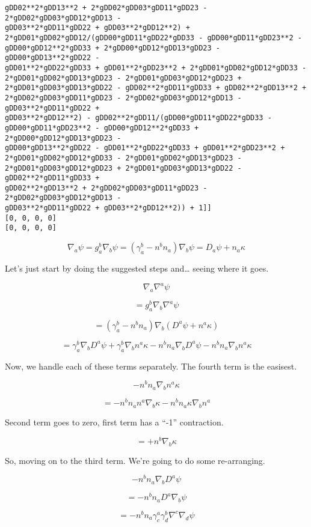 \documentclass[landscape,letterpaper,10pt,english]{article}
\begin{document}
\begin{Verbatim}[commandchars=\\\{\}]
gDD02**2*gDD13**2 + 2*gDD02*gDD03*gDD11*gDD23 - 2*gDD02*gDD03*gDD12*gDD13 -
gDD03**2*gDD11*gDD22 + gDD03**2*gDD12**2) +
2*gDD01*gDD02*gDD12/(gDD00*gDD11*gDD22*gDD33 - gDD00*gDD11*gDD23**2 -
gDD00*gDD12**2*gDD33 + 2*gDD00*gDD12*gDD13*gDD23 - gDD00*gDD13**2*gDD22 -
gDD01**2*gDD22*gDD33 + gDD01**2*gDD23**2 + 2*gDD01*gDD02*gDD12*gDD33 -
2*gDD01*gDD02*gDD13*gDD23 - 2*gDD01*gDD03*gDD12*gDD23 +
2*gDD01*gDD03*gDD13*gDD22 - gDD02**2*gDD11*gDD33 + gDD02**2*gDD13**2 +
2*gDD02*gDD03*gDD11*gDD23 - 2*gDD02*gDD03*gDD12*gDD13 - gDD03**2*gDD11*gDD22 +
gDD03**2*gDD12**2) - gDD02**2*gDD11/(gDD00*gDD11*gDD22*gDD33 -
gDD00*gDD11*gDD23**2 - gDD00*gDD12**2*gDD33 + 2*gDD00*gDD12*gDD13*gDD23 -
gDD00*gDD13**2*gDD22 - gDD01**2*gDD22*gDD33 + gDD01**2*gDD23**2 +
2*gDD01*gDD02*gDD12*gDD33 - 2*gDD01*gDD02*gDD13*gDD23 -
2*gDD01*gDD03*gDD12*gDD23 + 2*gDD01*gDD03*gDD13*gDD22 - gDD02**2*gDD11*gDD33 +
gDD02**2*gDD13**2 + 2*gDD02*gDD03*gDD11*gDD23 - 2*gDD02*gDD03*gDD12*gDD13 -
gDD03**2*gDD11*gDD22 + gDD03**2*gDD12**2)) + 1]]
[0, 0, 0, 0]
[0, 0, 0, 0]
    \end{Verbatim}

    \[ \nabla_a \psi = g^b_a \nabla_b \psi = (\gamma^b_a - n^bn_a)\nabla_b \psi = D_a \psi + n_a \kappa \]

    Let's just start by doing the suggested steps and\ldots{} seeing where
it goes.

\[\nabla_a \nabla^a \psi\]

\[ = g^b_a \nabla_b \nabla^a \psi \]

\[ = (\gamma^b_a - n^bn_a) \nabla_b (D^a \psi + n^a \kappa) \]

\[ = \gamma^b_a\nabla_b D^a \psi + \gamma^b_a \nabla_b n^a \kappa -n^bn_a \nabla_b D^a \psi - n^bn_a \nabla_b n^a \kappa \]

    Now, we handle each of these terms separately. The fourth term is the
easisest.

\[ -n^bn_a \nabla_b n^a \kappa \]

\[ = -n^bn_a n^a \nabla_b \kappa -n^bn_a \kappa \nabla_b n^a \]

Second term goes to zero, first term has a ``-1'' contraction.

\[ = + n^b \nabla_b \kappa \]

So, moving on to the third term. We're going to do some re-arranging.

\[ -n^bn_a \nabla_b D^a \psi \]

\[ = -n^bn_a D^a \nabla_b \psi \]

\[ = -n^bn_a \gamma^a_c \gamma_d^b \nabla^c \nabla_d \psi \]
\end{document}
